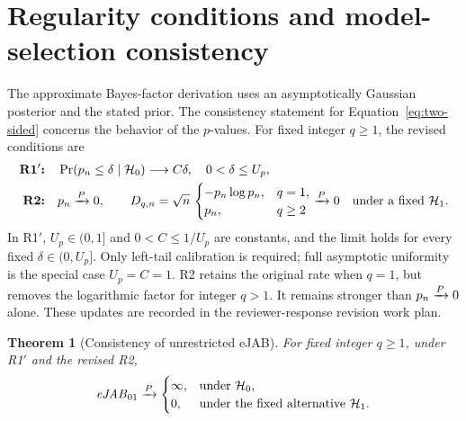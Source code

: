 \documentclass[11pt,letterpaper]{article}
\newtheorem{theorem}{Theorem}
\begin{document}
\section{Regularity conditions and model-selection consistency}
The approximate Bayes-factor derivation uses an asymptotically Gaussian
posterior and the stated prior. The consistency statement for
Equation~\eqref{eq:two-sided} concerns the behavior of the \(p\)-values.
For fixed integer \(q\geq1\), the revised conditions are
\begin{align}
 \textbf{R1$'$:}\quad &\Pr(p_n\leq\delta\mid\mathcal H_0)\longrightarrow C\delta, \quad 0<\delta\leq U_p, \label{eq:r1}\\
 \textbf{R2:}\quad &p_n\xrightarrow{P}0,\qquad D_{q,n}=\sqrt n\, \begin{cases} -p_n\log p_n,&q=1,\\ p_n,&q\geq2 \end{cases} \xrightarrow{P}0
 \quad\text{under a fixed }\mathcal H_1 .
 \label{eq:r2}
\end{align}
In R1$'$, \(U_p\in(0,1]\) and \(0<C\leq1/U_p\) are constants, and
the limit holds for every fixed \(\delta\in(0,U_p]\). Only left-tail
calibration is required; full asymptotic uniformity is the special case
\(U_p=C=1\). R2 retains the original rate when \(q=1\), but removes
the logarithmic factor for integer \(q>1\). It remains stronger than
\(p_n\xrightarrow{P}0\) alone. These updates are recorded in the reviewer-response
revision work plan.

\begin{theorem}[Consistency of unrestricted eJAB]
For fixed integer \(q\geq1\), under R1$'$ and the revised R2,
\begin{equation}
 \mathit{eJAB}_{01}\xrightarrow{P}
 \begin{cases}
  \infty,&\text{under }\mathcal H_0,\\
  0,&\text{under the fixed alternative }\mathcal H_1 .
 \end{cases}
 \label{eq:consistency}
\end{equation}
\end{theorem}
\end{document}
